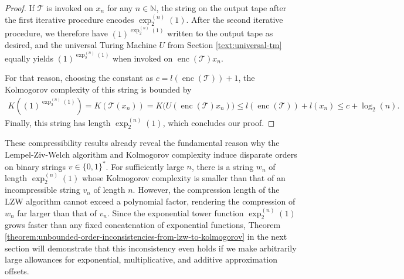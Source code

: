 \begin{proof}
	If $\mathcal{T}$ is invoked on $x_n$ for any $n\in\mathbb{N}$, the string on the output tape after the first iterative procedure encodes $\exp_2^{(n)}(1)$.
	After the second iterative procedure, we therefore have $(1)^{\exp_2^{(n)}(1)}$ written to the output tape as desired, and the universal Turing Machine $U$ from Section \ref{text:universal-tm} equally yields $(1)^{\exp_2^{(n)}(1)}$ when invoked on $\operatorname{enc}(\mathcal{T})x_n$.
	
	For that reason, choosing the constant as $c=l(\operatorname{enc}(\mathcal{T}))+1$, the Kolmogorov complexity of this string is bounded by
	\begin{align}
		K((1)^{\exp_2^{(n)}(1)})= K(\mathcal{T}(x_n)) = K\bigl(U(\operatorname{enc}(\mathcal{T})x_n)\bigr)
		\leq  l(\operatorname{enc}(\mathcal{T})) + l(x_n) \leq c+\log_2(n).
	\end{align}
	Finally, this string has length $\exp_2^{(n)}(1)$, which concludes our proof.
\end{proof}

These compressibility results already reveal the fundamental reason why the Lempel-Ziv-Welch algorithm and Kolmogorov complexity induce disparate orders on binary strings $v\in\{0,1\}^{*}$.
For sufficiently large $n$, there is a string $w_n$ of length $\exp_2^{(n)}(1)$ whose Kolmogorov complexity is smaller than that of an incompressible string $v_n$ of length $n$.
However, the compression length of the LZW algorithm cannot exceed a polynomial factor, rendering the compression of $w_n$ far larger than that of $v_n$. 
Since the exponential tower function $\exp_2^{(n)}(1)$ grows faster than any fixed concatenation of exponential functions,
Theorem \ref{theorem:unbounded-order-inconsistencies-from-lzw-to-kolmogorov} in the next section will demonstrate that this inconsistency even holds if we make arbitrarily large allowances for exponential, multiplicative, and additive approximation offsets.

